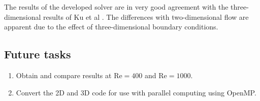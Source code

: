 \documentclass[12pt,a4paper,fleqn]{article}
\begin{document}
The results of the developed solver are in very good agreement with the three-dimensional results of Ku et al \cite{Ku:1987:PMS:33136.33145}. The differences with two-dimensional flow are apparent due to the effect of three-dimensional boundary conditions.

\newpage

\subsection{Future tasks}
\begin{enumerate}
    \item Obtain and compare results at \(\text{Re}=400\) and \(\text{Re}=1000\).
    \item Convert the 2D and 3D code for use with parallel computing using OpenMP.
\end{enumerate}



\end{document}
